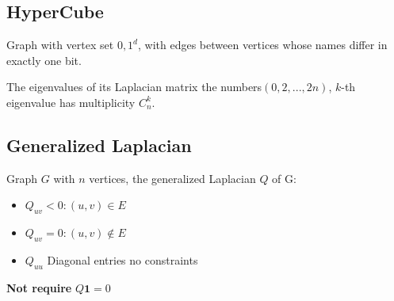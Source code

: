 \subsection{HyperCube}
Graph with vertex set ${0,1}^d$, with edges between vertices whose names differ in exactly one bit. 
\begin{lemma}
The eigenvalues of its Laplacian matrix the numbers$(0, 2, ..., 2n)$, $k$-th eigenvalue has multiplicity $C_n^k$.
\end{lemma}
\subsection{Generalized Laplacian}
Graph $G$ with $n$ vertices, the generalized Laplacian $Q$ of G:
\begin{itemize}
    \item $Q_{uv} <0:(u,v)\in E$
    \item $Q_{uv} =0:(u,v)\notin E$
    \item $Q_{uu}$ Diagonal entries no constraints
\end{itemize}
\textbf{Not require} $Q\textbf{1}=0$